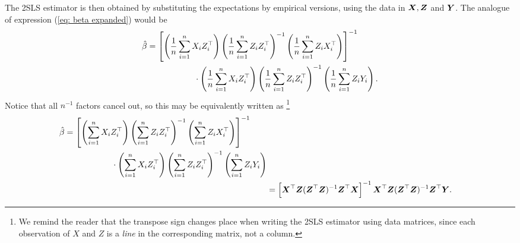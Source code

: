 The 2SLS estimator is then obtained by substituting the expectations by empirical versions, using the data in $ \boldsymbol X, \boldsymbol Z $ and $ \boldsymbol Y $.
The analogue of expression (\ref{eq: beta expanded}) would be
\begin{align}
    \label{eq: beta hat expanded}
    \begin{split}
        \hat{ \beta }
        &=
        \left[
            \left(
                \frac{ 1 }{ n } \sum_{ i=1 }^{ n } X_{ i } Z_{ i }^{ \top }
            \right)
            \left(
                \frac{ 1 }{ n } \sum_{ i=1 }^{ n } Z_{ i } Z_{ i }^{ \top }
            \right)^{ -1 }
            \left(
                \frac{ 1 }{ n } \sum_{ i=1 }^{ n } Z_{ i } X_{ i }^{ \top }
            \right)
        \right]^{ -1 } \\
        &\hspace{2cm} \cdot
        \left(
            \frac{ 1 }{ n } \sum_{ i=1 }^{ n } X_{ i } Z_{ i }^{ \top }
        \right)
        \left(
            \frac{ 1 }{ n } \sum_{ i=1 }^{ n } Z_{ i } Z_{ i }^{ \top }
        \right)^{ -1 }
        \left(
            \frac{ 1 }{ n } \sum_{ i=1 }^{ n } Z_{ i } Y_{ i }
        \right).
    \end{split}
\end{align}        
Notice that all $ n^{ -1 } $ factors cancel out, so this may be equivalently written as
\footnote{
We remind the reader that the transpose sign changes place when writing the 2SLS estimator using data matrices, since each observation of $ X $ and $ Z $ is a \emph{line} in the corresponding matrix, not a column.
}
\begin{align*}
    \begin{split}
        \hat{ \beta }
        &= 
        \left[
            \left(
                \sum_{ i=1 }^{ n } X_{ i } Z_{ i }^{ \top }
            \right)
            \left(
                \sum_{ i=1 }^{ n } Z_{ i } Z_{ i }^{ \top }
            \right)^{ -1 }
            \left(
                \sum_{ i=1 }^{ n } Z_{ i } X_{ i }^{ \top }
            \right)
        \right]^{ -1 } \\
        &\hspace{2cm} \cdot
        \left(
            \sum_{ i=1 }^{ n } X_{ i } Z_{ i }^{ \top }
        \right)
        \left(
            \sum_{ i=1 }^{ n } Z_{ i } Z_{ i }^{ \top }
        \right)^{ -1 }
        \left(
            \sum_{ i=1 }^{ n } Z_{ i } Y_{ i }
        \right)
    \end{split} \\
    &= \left[
        \boldsymbol X^{ \top } \boldsymbol Z ( \boldsymbol Z^{ \top } \boldsymbol Z )^{ -1 } \boldsymbol Z^{ \top } \boldsymbol X
    \right]^{ -1 }
    \boldsymbol X^{ \top } \boldsymbol Z ( \boldsymbol Z^{ \top } \boldsymbol Z )^{ -1 } \boldsymbol Z^{ \top } \boldsymbol Y
.\end{align*}
